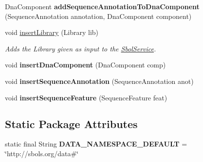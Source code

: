 \begin{DoxyCompactItemize}
\item 
\hypertarget{classorg_1_1sbolstandard_1_1rdf_1_1_sbol_service_aa99a884c2378cef0b2b4741637a56d00}{
DnaComponent {\bfseries addSequenceAnnotationToDnaComponent} (SequenceAnnotation annotation, DnaComponent component)}
\label{classorg_1_1sbolstandard_1_1rdf_1_1_sbol_service_aa99a884c2378cef0b2b4741637a56d00}

\item 
void \hyperlink{classorg_1_1sbolstandard_1_1rdf_1_1_sbol_service_a96b5821c89233871863efb31ae98d629}{insertLibrary} (Library lib)
\begin{DoxyCompactList}\small\item\em Adds the Library given as input to the \hyperlink{classorg_1_1sbolstandard_1_1rdf_1_1_sbol_service}{SbolService}. \item\end{DoxyCompactList}\item 
\hypertarget{classorg_1_1sbolstandard_1_1rdf_1_1_sbol_service_a68017de73adfaf0fe2cc0bb88ee10ccb}{
void {\bfseries insertDnaComponent} (DnaComponent comp)}
\label{classorg_1_1sbolstandard_1_1rdf_1_1_sbol_service_a68017de73adfaf0fe2cc0bb88ee10ccb}

\item 
\hypertarget{classorg_1_1sbolstandard_1_1rdf_1_1_sbol_service_a63e4420d05d6fffa910fccd9f3aae032}{
void {\bfseries insertSequenceAnnotation} (SequenceAnnotation anot)}
\label{classorg_1_1sbolstandard_1_1rdf_1_1_sbol_service_a63e4420d05d6fffa910fccd9f3aae032}

\item 
\hypertarget{classorg_1_1sbolstandard_1_1rdf_1_1_sbol_service_a3d36f09a42ea6b9248c8f6894420a1f8}{
void {\bfseries insertSequenceFeature} (SequenceFeature feat)}
\label{classorg_1_1sbolstandard_1_1rdf_1_1_sbol_service_a3d36f09a42ea6b9248c8f6894420a1f8}

\end{DoxyCompactItemize}
\subsection*{Static Package Attributes}
\begin{DoxyCompactItemize}
\item 
\hypertarget{classorg_1_1sbolstandard_1_1rdf_1_1_sbol_service_a20b86331ad9418b0c6b737a193b5b051}{
static final String {\bfseries DATA\_\-NAMESPACE\_\-DEFAULT} = \char`\"{}http://sbols.org/data\#\char`\"{}}
\label{classorg_1_1sbolstandard_1_1rdf_1_1_sbol_service_a20b86331ad9418b0c6b737a193b5b051}

\end{DoxyCompactItemize}


